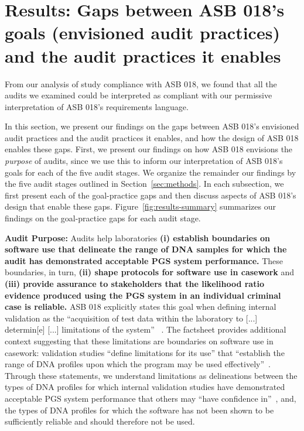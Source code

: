 \section{Results: Gaps between ASB 018's goals (envisioned audit practices) and the audit practices it enables}
\label{sec:results}
From our analysis of study compliance with ASB 018, we found that all the audits we examined could be interpreted as compliant with our permissive interpretation of ASB 018's requirements language. 

In this section, we present our findings on the gaps between ASB 018's envisioned audit practices and the audit practices it enables, and how the design of ASB 018 enables these gaps. First, we present our findings on how ASB 018 envisions the \textit{purpose} of audits, since we use this to inform our interpretation of ASB 018's goals for each of the five audit stages. We organize the remainder our findings by the five audit stages outlined in Section~\ref{sec:methods}. In each subsection, we first present each of the goal-practice gaps and then discuss aspects of ASB 018's design that enable these gaps. Figure~\ref{fig:results-summary} summarizes our findings on the goal-practice gaps for each audit stage.

\textbf{Audit Purpose:} Audits help laboratories \textbf{(i) establish boundaries on software use that delineate the range of DNA samples for which the audit has demonstrated acceptable PGS system performance.} These boundaries, in turn, \textbf{(ii) shape protocols for software use in casework} and \textbf{(iii) provide assurance to stakeholders that the likelihood ratio evidence produced using the PGS system in an individual criminal case is reliable.} ASB 018 explicitly states this goal when defining internal validation as the ``acquisition of test data within the laboratory to [...] determin[e] [...] limitations of the system'' ~\cite[p.2]{asb018}. The factsheet provides additional context suggesting that these limitations are boundaries on software use in casework: validation studies ``define limitations for its use'' that ``establish the range of DNA profiles upon which the program may be used effectively''~\cite{asb018factsheet}. Through these statements, we understand  limitations as delineations between the types of DNA profiles for which internal validation studies have demonstrated acceptable PGS system performance that others may ``have confidence in''~\cite{asb018factsheet}, and, the types of DNA profiles for which the software has not been shown to be sufficiently reliable and should therefore not be used. 

